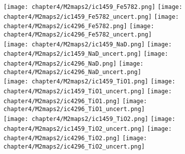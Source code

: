 \begin{figure*}
	\centering
	\texttt{[image: chapter4/M2maps2/ic1459\_Fe5782.png]}
	\texttt{[image: chapter4/M2maps2/ic1459\_Fe5782\_uncert.png]}
	\texttt{[image: chapter4/M2maps2/ic4296\_Fe5782.png]}
	\texttt{[image: chapter4/M2maps2/ic4296\_Fe5782\_uncert.png]}
	\\
	\texttt{[image: chapter4/M2maps2/ic1459\_NaD.png]}
	\texttt{[image: chapter4/M2maps2/ic1459\_NaD\_uncert.png]}
	\texttt{[image: chapter4/M2maps2/ic4296\_NaD.png]}
	\texttt{[image: chapter4/M2maps2/ic4296\_NaD\_uncert.png]}
	\\
	\texttt{[image: chapter4/M2maps2/ic1459\_TiO1.png]}
	\texttt{[image: chapter4/M2maps2/ic1459\_TiO1\_uncert.png]}
	\texttt{[image: chapter4/M2maps2/ic4296\_TiO1.png]}
	\texttt{[image: chapter4/M2maps2/ic4296\_TiO1\_uncert.png]}
	\\
	\texttt{[image: chapter4/M2maps2/ic1459\_TiO2.png]}
	\texttt{[image: chapter4/M2maps2/ic1459\_TiO2\_uncert.png]}
	\texttt{[image: chapter4/M2maps2/ic4296\_TiO2.png]}
	\texttt{[image: chapter4/M2maps2/ic4296\_TiO2\_uncert.png]}
	\\
\end{figure*}

